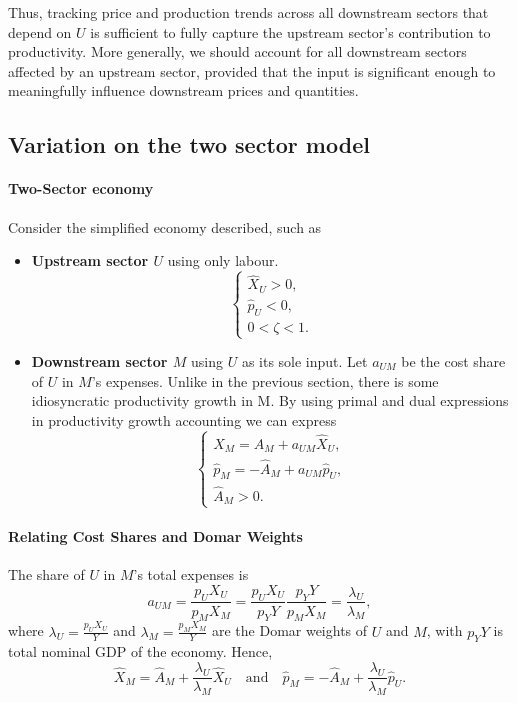 \documentclass[11pt]{article}
\begin{document}
Thus, tracking price and production trends across all downstream sectors that depend on $U$ is sufficient to fully capture the upstream sector's contribution to productivity. More generally, we should account for all downstream sectors affected by an upstream sector, provided that the input is significant enough to meaningfully influence downstream prices and quantities.


\subsection{Variation on the two sector model}

\paragraph{Two-Sector economy} Consider the simplified economy described, such as
\begin{itemize}
    \item \textbf{Upstream sector $U$} using only labour. 
    \[
    \begin{cases}
    \hat{X}_U > 0,\\
    \hat{p}_U < 0,\\
    0 < \zeta < 1.
    \end{cases}
    \]
    \item \textbf{Downstream sector $M$} using $U$ as its sole input. Let $a_{UM}$ be the cost share of $U$ in $M$'s expenses. Unlike in the previous section, there is some idiosyncratic productivity growth in M. By using primal and dual expressions in productivity growth accounting we can express
    \[
    \begin{cases}
    \hat{X}_M = \hat{A}_M+a_{UM}  \hat{X}_U,\\
    \hat{p}_M = -\hat{A}_M+a_{UM}  \hat{p}_U,\\
    \hat{A}_M > 0.
    \end{cases}
    \]
\end{itemize}

\paragraph{Relating Cost Shares and Domar Weights}
The share of $U$ in $M$'s total expenses is
\begin{equation*}
     a_{UM}  =  \frac{p_U X_U}{p_M X_M}  =  \frac{p_U X_U}{p_Y Y} \frac{p_Y Y}{p_M X_M} 
     =  \frac{\lambda_U}{\lambda_M},
\end{equation*}
where $\lambda_U = \tfrac{p_U X_U}{Y}$ and $\lambda_M = \tfrac{p_M X_M}{Y}$ are the Domar weights of $U$ and $M$, with $p_Y Y$ is total nominal GDP of the economy. Hence, 
\begin{equation*}
    \hat{X}_M = \hat{A}_M+\frac{\lambda_U}{\lambda_M} \hat{X}_U
    \quad\text{and}\quad
    \hat{p}_M = -\hat{A}_M+\frac{\lambda_U}{\lambda_M} \hat{p}_U.
\end{equation*}
\end{document}
